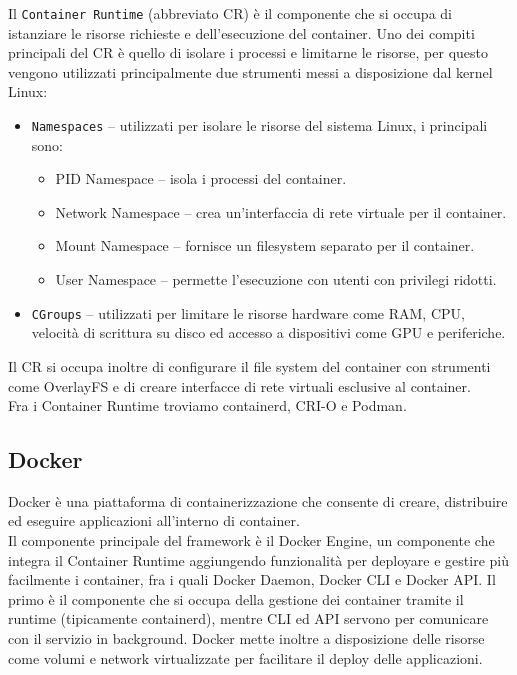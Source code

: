 Il \texttt{Container Runtime} (abbreviato CR) è il componente che si occupa di istanziare le risorse richieste e dell'esecuzione del container\cite{Martin2018Exploring}. Uno dei compiti principali del CR è quello di isolare i processi e limitarne le risorse, per questo vengono utilizzati principalmente due strumenti messi a disposizione dal kernel Linux:
\begin{itemize}
    \item \texttt{Namespaces} -- utilizzati per isolare le risorse del sistema Linux, i principali sono:
    \begin{itemize}
        \item PID Namespace -- isola i processi del container.
        \item Network Namespace -- crea un'interfaccia di rete virtuale per il container.
        \item Mount Namespace -- fornisce un filesystem separato per il container.
        \item User Namespace -- permette l’esecuzione con utenti con privilegi ridotti.
    \end{itemize}

    \item \texttt{CGroups} -- utilizzati per limitare le risorse hardware come RAM, CPU, velocità di scrittura su disco ed accesso a dispositivi come GPU e periferiche.
    
\end{itemize}

Il CR si occupa inoltre di configurare il file system del container con strumenti come OverlayFS e di creare interfacce di rete virtuali esclusive al container.\\
Fra i Container Runtime troviamo containerd, CRI-O e Podman.

\subsection{Docker}

Docker è una piattaforma di containerizzazione\cite{Anderson2015Docker} che consente di creare, distribuire ed eseguire applicazioni all'interno di container.\\
Il componente principale del framework è il Docker Engine, un componente che integra il Container Runtime aggiungendo funzionalità per deployare e gestire più facilmente i container, fra i quali Docker Daemon, Docker CLI e Docker API. Il primo è il componente che si occupa della gestione dei container tramite il runtime (tipicamente containerd), mentre CLI ed API servono per comunicare con il servizio in background. Docker mette inoltre a disposizione delle risorse come volumi e network virtualizzate per facilitare il deploy delle applicazioni.\\

